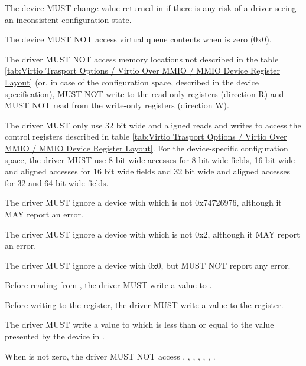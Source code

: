 The device MUST change value returned in  if there is any risk of a
driver seeing an inconsistent configuration state.

The device MUST NOT access virtual queue contents when  is zero (0x0).

The driver MUST NOT access memory locations not described in the
table \ref{tab:Virtio Trasport Options / Virtio Over MMIO / MMIO Device Register Layout}
(or, in case of the configuration space, described in the device specification),
MUST NOT write to the read-only registers (direction R) and
MUST NOT read from the write-only registers (direction W).

The driver MUST only use 32 bit wide and aligned reads and writes to access the control registers
described in table \ref{tab:Virtio Trasport Options / Virtio Over MMIO / MMIO Device Register Layout}.
For the device-specific configuration space, the driver MUST use 8 bit wide accesses for
8 bit wide fields, 16 bit wide and aligned accesses for 16 bit wide fields and 32 bit wide and
aligned accesses for 32 and 64 bit wide fields.

The driver MUST ignore a device with  which is not 0x74726976,
although it MAY report an error.

The driver MUST ignore a device with  which is not 0x2,
although it MAY report an error.

The driver MUST ignore a device with  0x0,
but MUST NOT report any error.

Before reading from , the driver MUST write a value to .

Before writing to the  register, the driver MUST write a value to the  register.

The driver MUST write a value to  which is less than
or equal to the value presented by the device in .

When  is not zero, the driver MUST NOT access
, , ,
, , , .

